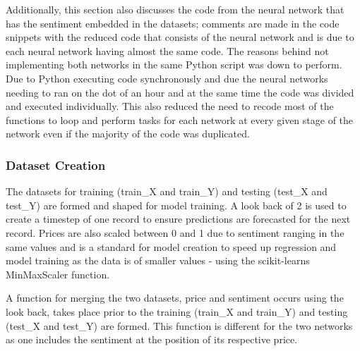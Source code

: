 \documentclass[oneside, 12pt]{article}
\begin{document}
		Additionally, this section also discusses the code from the neural network that has the sentiment embedded in the datasets; comments are made in the code snippets with the reduced code that consists of the neural network and is due to each neural network having almost the same code. The reasons behind not implementing both networks in the same Python script was down to perform. Due to Python executing code synchronously and due the neural networks needing to ran on the dot of an hour and at the same time the code was divided and executed individually. This also reduced the need to recode most of the functions to loop and perform tasks for each network at every given stage of the network even if the majority of the code was duplicated.
		
		\subsubsection{Dataset Creation}
		
		The datasets for training (train\_X and train\_Y) and testing (test\_X and test\_Y) are formed and shaped for model training. A look back of 2 is used to create a timestep of one record to ensure predictions are forecasted for the next record. Prices are also scaled between 0 and 1 due to sentiment ranging in the same values and is a standard for model creation to speed up regression and model training as the data is of smaller values - using the scikit-learns MinMaxScaler function.
		
		A function for merging the two datasets, price and sentiment occurs using the look back, takes place prior to the training (train\_X and train\_Y) and testing (test\_X and test\_Y) are formed. This function is different for the two networks as one includes the sentiment at the position of its respective price.
		
\end{document}
